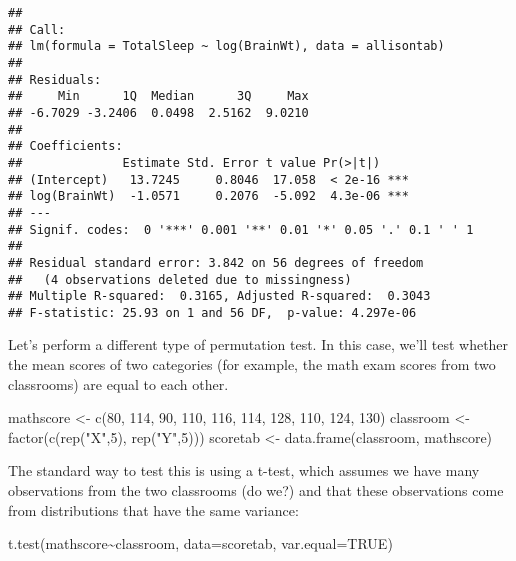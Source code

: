 \documentclass[
]{book}
\newenvironment{Shaded}{\begin{snugshade}}{\end{snugshade}}
\newcommand{\AttributeTok}[1]{\textcolor[rgb]{0.77,0.63,0.00}{#1}}
\newcommand{\ConstantTok}[1]{\textcolor[rgb]{0.00,0.00,0.00}{#1}}
\newcommand{\DecValTok}[1]{\textcolor[rgb]{0.00,0.00,0.81}{#1}}
\newcommand{\FunctionTok}[1]{\textcolor[rgb]{0.00,0.00,0.00}{#1}}
\newcommand{\NormalTok}[1]{#1}
\newcommand{\OtherTok}[1]{\textcolor[rgb]{0.56,0.35,0.01}{#1}}
\newcommand{\SpecialCharTok}[1]{\textcolor[rgb]{0.00,0.00,0.00}{#1}}
\newcommand{\StringTok}[1]{\textcolor[rgb]{0.31,0.60,0.02}{#1}}
\begin{document}
\begin{verbatim}
## 
## Call:
## lm(formula = TotalSleep ~ log(BrainWt), data = allisontab)
## 
## Residuals:
##     Min      1Q  Median      3Q     Max 
## -6.7029 -3.2406  0.0498  2.5162  9.0210 
## 
## Coefficients:
##              Estimate Std. Error t value Pr(>|t|)    
## (Intercept)   13.7245     0.8046  17.058  < 2e-16 ***
## log(BrainWt)  -1.0571     0.2076  -5.092  4.3e-06 ***
## ---
## Signif. codes:  0 '***' 0.001 '**' 0.01 '*' 0.05 '.' 0.1 ' ' 1
## 
## Residual standard error: 3.842 on 56 degrees of freedom
##   (4 observations deleted due to missingness)
## Multiple R-squared:  0.3165, Adjusted R-squared:  0.3043 
## F-statistic: 25.93 on 1 and 56 DF,  p-value: 4.297e-06
\end{verbatim}

Let's perform a different type of permutation test. In this case, we'll test whether the mean scores of two categories (for example, the math exam scores from two classrooms) are equal to each other.

\begin{Shaded}
\begin{Highlighting}[]
\NormalTok{mathscore }\OtherTok{\textless{}{-}} \FunctionTok{c}\NormalTok{(}\DecValTok{80}\NormalTok{, }\DecValTok{114}\NormalTok{, }\DecValTok{90}\NormalTok{, }\DecValTok{110}\NormalTok{, }\DecValTok{116}\NormalTok{, }\DecValTok{114}\NormalTok{, }\DecValTok{128}\NormalTok{, }\DecValTok{110}\NormalTok{, }\DecValTok{124}\NormalTok{, }\DecValTok{130}\NormalTok{)}
\NormalTok{classroom }\OtherTok{\textless{}{-}} \FunctionTok{factor}\NormalTok{(}\FunctionTok{c}\NormalTok{(}\FunctionTok{rep}\NormalTok{(}\StringTok{"X"}\NormalTok{,}\DecValTok{5}\NormalTok{), }\FunctionTok{rep}\NormalTok{(}\StringTok{"Y"}\NormalTok{,}\DecValTok{5}\NormalTok{)))}
\NormalTok{scoretab }\OtherTok{\textless{}{-}} \FunctionTok{data.frame}\NormalTok{(classroom, mathscore)}
\end{Highlighting}
\end{Shaded}

The standard way to test this is using a t-test, which assumes we have many observations from the two classrooms (do we?) and that these observations come from distributions that have the same variance:

\begin{Shaded}
\begin{Highlighting}[]
\FunctionTok{t.test}\NormalTok{(mathscore}\SpecialCharTok{\textasciitilde{}}\NormalTok{classroom, }\AttributeTok{data=}\NormalTok{scoretab, }\AttributeTok{var.equal=}\ConstantTok{TRUE}\NormalTok{)}
\end{Highlighting}
\end{Shaded}
\end{document}
